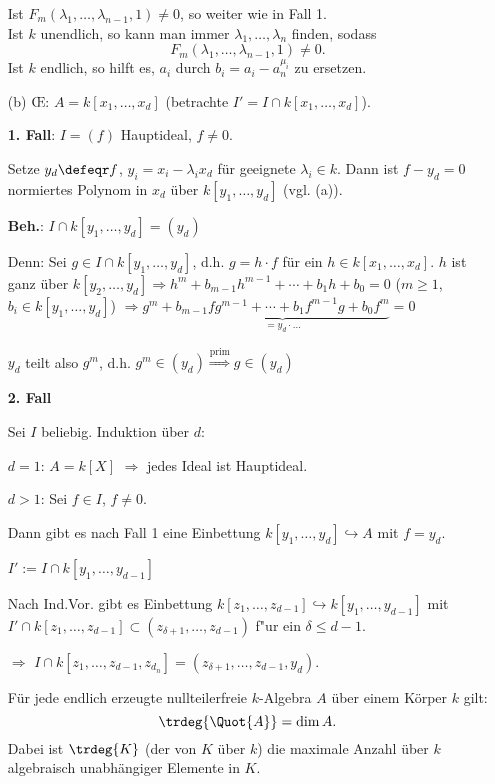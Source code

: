 \begin{Bew}
\begin{enumerate}
Ist $F_m(\lambda_1,\ldots, \lambda_{n-1},1)\neq 0$, so weiter wie in Fall 1.\\
Ist $k$ unendlich, so kann man immer $\lambda_1,\ldots,\lambda_n$ finden, sodass
\[
F_m(\lambda_1,\ldots,\lambda_{n-1},1)\neq 0.
\]
Ist $k$ endlich, so hilft es, $a_i$ durch $b_i=a_i-a_n^{\mu_i}$ zu ersetzen.

\item[(b)] \OE: $A=k[x_1,\ldots,x_d]$ (betrachte $I'=I\cap k[x_1,\ldots,x_d]$).

\textbf{1. Fall}: $I=(f)$ Hauptideal, $f\neq 0$.

Setze $y_d\defeqr f$, $y_i=x_i-\lambda_ix_d$ f\"ur geeignete $\lambda_i\in k$.
Dann ist $f-y_d=0$ normiertes Polynom in $x_d$ \"uber $k[y_1,\ldots,y_d]$ (vgl. (a)).

\textbf{Beh.}: $I\cap k[y_1,\ldots, y_d]=(y_d)$

Denn: Sei $g\in I\cap k[y_1,\ldots, y_d]$, d.h. $g=h\cdot f $ f\"ur ein $h\in k[x_1,\ldots,x_d]$.
$h$ ist ganz \"uber $k[y_2,\ldots, y_d]
\Rightarrow h^m+b_{m-1}h^{m-1}+\cdots+b_1h+b_0=0$
($m\geq 1$, $b_i\in k[y_1,\ldots, y_d]$) $\Rightarrow g^m+\underbrace{b_{m-1}fg^{m-1}+\cdots+
b_1f^{m-1}g+b_0f^m}_{=y_d\cdot\ldots}=0$

$y_d$ teilt also $g^m$, d.h. $g^m\in (y_d)\stackrel{\text{prim}}{\Rightarrow} g\in (y_d)$

\textbf{2. Fall}

Sei $I$ beliebig. Induktion \"uber $d$:

$d=1$:	$A = k[X]$ $\Rightarrow$ jedes Ideal ist Hauptideal.

$d>1$: Sei $f \in I$, $f \neq 0$.

Dann gibt es nach Fall 1 eine Einbettung $k[y_1, \ldots, y_d] \hookrightarrow A$ mit $f = y_d$.

$I' := I \cap k[y_1, \ldots, y_{d-1}]$

Nach Ind.Vor. gibt es Einbettung $k[z_1, \ldots, z_{d-1}] \hookrightarrow k[y_1, \ldots, y_{d-1}]$ mit $I' \cap k[z_1, \ldots, z_{d-1}] \subset (z_{\delta+1}, \ldots, z_{d-1})$ f"ur ein $\delta \leq d-1$.

$\Rightarrow$ $I \cap k[z_1, \ldots, z_{d-1}, z_{d_n}] = (z_{\delta+1}, \ldots, z_{d-1}, y_d)$.

\begin{nnFolg}
F\"ur jede endlich erzeugte nullteilerfreie $k$-Algebra $A$ \"uber einem K\"orper $k$ gilt:
\[
\trdeg{\Quot{A}} = \dim A.
\]
Dabei ist $\trdeg{K}$ (der  von
$K$ \"uber $k$) die maximale Anzahl \"uber $k$ algebraisch unabh\"angiger
Elemente in $K$.
\end{nnFolg}

\end{enumerate}
\end{Bew}
